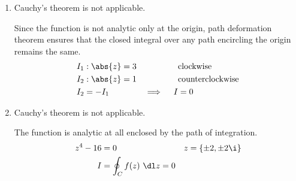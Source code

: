 \begin{enumerate}
          \begin{figure}[H]
              \centering
          \end{figure}

    \item Cauchy's theorem \textcolor{y_p}{is not applicable}. \par
          Since the function is not analytic only at the origin, path deformation
          theorem ensures that the closed integral over any path encircling the origin
          remains the same.
          \begin{align}
              I_1              & : \abs{z} = 3           &
                               & \text{clockwise}          \\
              I_2              & : \abs{z} = 1           &
                               & \text{counterclockwise}   \\
              I_2              & = -I_1                  &
              \implies \quad I & = 0
          \end{align}

    \item Cauchy's theorem \textcolor{y_p}{is not applicable}. \par
          The function is analytic at all enclosed by the path of integration.
          \begin{align}
              z^4 - 16 & = 0                       &
              z        & = \{\pm 2, \pm 2\i\}        \\
              I        & = \oint_C f(z)\ \dl z = 0
          \end{align}


\end{enumerate}
